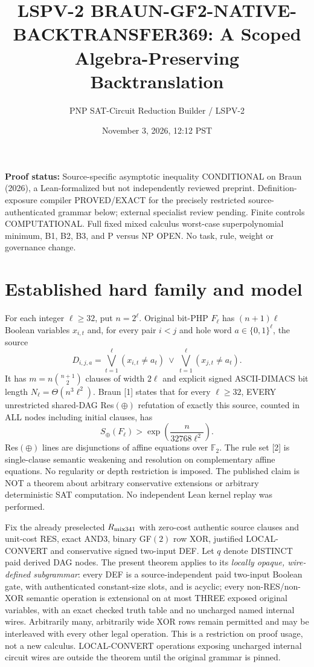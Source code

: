 \documentclass[11pt]{article}
\title{LSPV-2 BRAUN-GF2-NATIVE-BACKTRANSFER369: A Scoped Algebra-Preserving Backtranslation}
\author{PNP SAT-Circuit Reduction Builder / LSPV-2}
\date{November 3, 2026, 12:12 PST}
\begin{document}
\maketitle
\noindent \textbf{Proof status:} Source-specific asymptotic inequality CONDITIONAL on Braun (2026), a Lean-formalized but not independently reviewed preprint. Definition-exposure compiler PROVED/EXACT for the precisely restricted source-authenticated grammar below; external specialist review pending. Finite controls COMPUTATIONAL. Full fixed mixed calculus worst-case superpolynomial minimum, B1, B2, B3, and P versus NP OPEN. No task, rule, weight or governance change.

\section*{Established hard family and model}
For each integer $\ell\ge32$, put $n=2^\ell$. Original bit-PHP $F_\ell$ has $(n+1)\ell$ Boolean variables $x_{i,t}$ and, for every pair $i<j$ and hole word $a\in\{0,1\}^\ell$, the source
\[
D_{i,j,a}=\bigvee_{t=1}^{\ell}(x_{i,t}\ne a_t)\ \vee\
\bigvee_{t=1}^{\ell}(x_{j,t}\ne a_t).
\]
It has $m=n\binom{n+1}{2}$ clauses of width $2\ell$ and explicit signed ASCII-DIMACS bit length $N_\ell=\Theta(n^3\ell^2)$. Braun [1] states that for every $\ell\ge32$, EVERY unrestricted shared-DAG Res$(\oplus)$ refutation of exactly this source, counted in ALL nodes including initial clauses, has
\[
S_\oplus(F_\ell)>\exp\left(\frac{n}{32768\ell^2}\right). \tag{B}
\]
Res$(\oplus)$ lines are disjunctions of affine equations over $\mathbb F_2$. The rule set [2] is single-clause semantic weakening and resolution on complementary affine equations. No regularity or depth restriction is imposed. The published claim is NOT a theorem about arbitrary conservative extensions or arbitrary deterministic SAT computation. No independent Lean kernel replay was performed.

Fix the already preselected $R_{\rm mix341}$ with zero-cost authentic source clauses and unit-cost RES, exact AND3, binary GF$(2)$ row XOR, justified LOCAL-CONVERT and conservative signed two-input DEF. Let $q$ denote DISTINCT paid derived DAG nodes. The present theorem applies to its \emph{locally opaque, wire-defined subgrammar}: every DEF is a source-independent paid two-input Boolean gate, with authenticated constant-size slots, and is acyclic; every non-RES/non-XOR semantic operation is extensional on at most THREE exposed original variables, with an exact checked truth table and no uncharged named internal wires. Arbitrarily many, arbitrarily wide XOR rows remain permitted and may be interleaved with every other legal operation. This is a restriction on proof usage, not a new calculus. LOCAL-CONVERT operations exposing uncharged internal circuit wires are outside the theorem until the original grammar is pinned.
\end{document}
